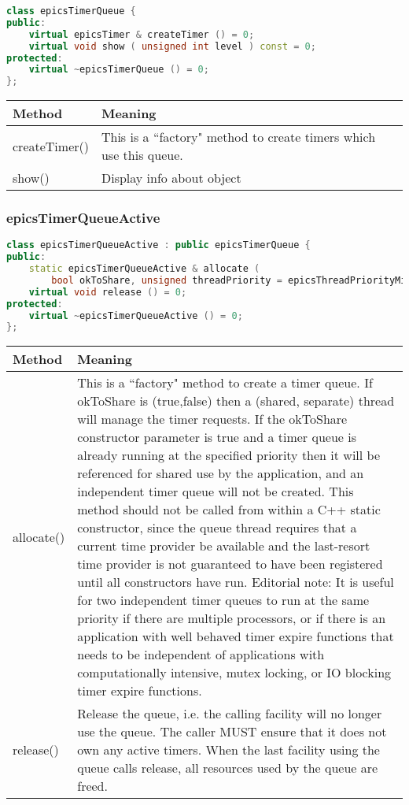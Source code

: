 \begin{lstlisting}[language=C++]
class epicsTimerQueue {
public:
    virtual epicsTimer & createTimer () = 0;
    virtual void show ( unsigned int level ) const = 0;
protected:
    virtual ~epicsTimerQueue () = 0;
};
\end{lstlisting}

\begin{center}
\begin{longtable}{p{1.1in}p{5.0in}}
\textbf{Method} & \textbf{Meaning}\\
\hline
createTimer() & This is a ``factory" method to create timers which use this queue.\\
show() & Display info about object
\end{longtable}

\end{center}


\subsubsection{epicsTimerQueueActive}

\begin{lstlisting}[language=C++]
class epicsTimerQueueActive : public epicsTimerQueue {
public:
    static epicsTimerQueueActive & allocate (
        bool okToShare, unsigned threadPriority = epicsThreadPriorityMin + 10 );
    virtual void release () = 0;
protected:
    virtual ~epicsTimerQueueActive () = 0;
};
\end{lstlisting}

\begin{center}
\begin{longtable}{p{1.1in}p{5.0in}}
\textbf{Method} & \textbf{Meaning}\\
\hline
allocate() &
This is a ``factory" method to create a timer queue.
If okToShare is (true,false) then a (shared, separate) thread will manage the timer requests.
If the okToShare constructor parameter is true and a timer queue is already running at the specified priority then it will be referenced for shared use by the application, and an independent timer queue will not be created.
This method should not be called from within a C++ static constructor, since the queue thread requires that a current time provider be available and the last-resort time provider is not guaranteed to have been registered until all constructors have run.
Editorial note: It is useful for two independent timer queues to run at the same priority if there are multiple processors, or if there is an application with well behaved timer expire functions that needs to be independent of applications with computationally intensive, mutex locking, or IO blocking timer expire functions. \\

release() &
Release the queue, i.e. the calling facility will no longer use the queue.
The caller MUST ensure that it does not own any active timers.
When the last facility using the queue calls release, all resources used by the queue are freed.
\end{longtable}

\end{center}


